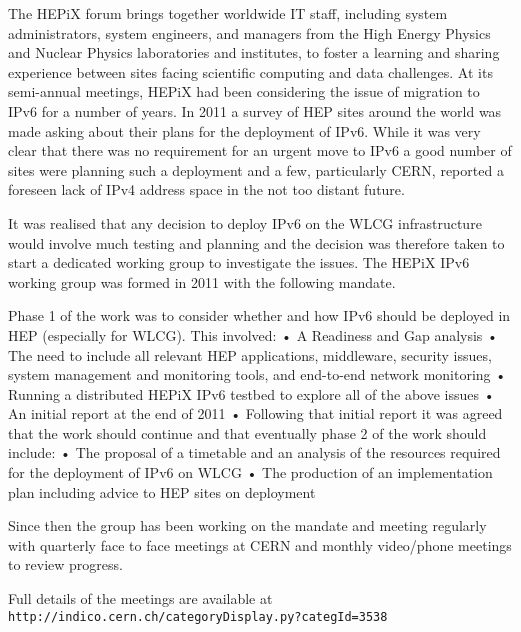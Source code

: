 The HEPiX forum brings together worldwide IT staff, including system administrators, system engineers, and managers from the High Energy Physics and Nuclear Physics laboratories and institutes, to foster a learning and sharing experience between sites facing scientific computing and data challenges. At its semi-annual meetings, HEPiX had been considering the issue of migration to IPv6 for a number of years. In 2011 a survey of HEP sites around the world was made asking about their plans for the deployment of IPv6. While it was very clear that there was no requirement for an urgent move to IPv6 a good number of sites were planning such a deployment and a few, particularly CERN, reported a foreseen lack of IPv4 address space in the not too distant future.

It was realised that any decision to deploy IPv6 on the WLCG infrastructure would involve much testing and planning and the decision was therefore taken to start a dedicated working group to investigate the issues. The HEPiX IPv6 working group was formed in 2011 with the following mandate.

Phase 1 of the work was to consider whether and how IPv6 should be deployed in HEP (especially for WLCG). This involved:
	•	A Readiness and Gap analysis
	•	The need to include all relevant HEP applications, middleware, security issues, system management and monitoring tools, and end-to-end network monitoring
	•	Running a distributed HEPiX IPv6 testbed to explore all of the above issues
	•	An initial report at the end of 2011
	•	
Following that initial report it was agreed that the work should continue and that eventually phase 2 of the work should include:
	•	The proposal of a timetable and an analysis of the resources required for the deployment of IPv6 on WLCG
	•	The production of an implementation plan including advice to HEP sites on deployment

Since then the group has been working on the mandate and meeting regularly with quarterly face to face meetings at CERN and monthly video/phone meetings to review progress. 

Full details of the meetings are available at \tt {http://indico.cern.ch/categoryDisplay.py?categId=3538}


